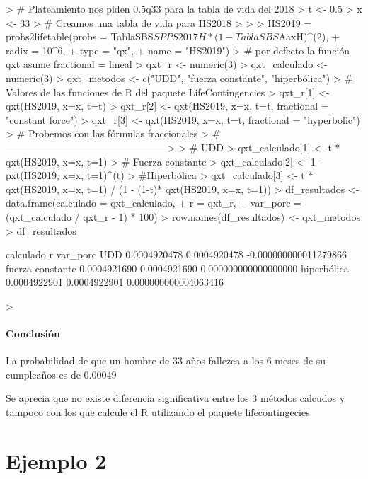 \documentclass[12pt]{report}
\begin{document}
\begin{Schunk}
\begin{Sinput}
> # Plateamiento nos piden 0.5q33 para la tabla de vida del 2018
> t <- 0.5
> x <- 33
> # Creamos una tabla de vida para HS2018
> 
> 
> HS2019  = probs2lifetable(probs = TablaSBS$SPPS2017H * (1 - TablaSBS$AaxH)^(2), 
+                           radix = 10^6,   
+                           type = "qx",  
+                           name = "HS2019")
> # por defecto la función qxt asume fractional = lineal
> qxt_r <- numeric(3)
> qxt_calculado <- numeric(3)
> qxt_metodos <- c("UDD", "fuerza constante", "hiperbólica")
> # Valores de las funciones de R del paquete LifeContingencies
> qxt_r[1] <- qxt(HS2019, x=x, t=t)
> qxt_r[2] <- qxt(HS2019, x=x, t=t, fractional = "constant force")
> qxt_r[3] <- qxt(HS2019, x=x, t=t, fractional = "hyperbolic")
> # Probemos con las fórmulas fraccionales
> #------------------------------------------------
> 
> # UDD
> qxt_calculado[1] <- t * qxt(HS2019, x=x, t=1) 
> # Fuerza constante
> qxt_calculado[2] <- 1 - pxt(HS2019, x=x, t=1)^(t) 
> #Hiperbólica
> qxt_calculado[3] <- t * qxt(HS2019, x=x, t=1) / (1 - (1-t)* qxt(HS2019, x=x, t=1)) 
> df_resultados <- data.frame(calculado = qxt_calculado,
+                             r = qxt_r,
+                             var_porc = (qxt_calculado / qxt_r - 1) * 100)
> row.names(df_resultados) <- qxt_metodos
> df_resultados
\end{Sinput}
\begin{Soutput}
                    calculado            r              var_porc
UDD              0.0004920478 0.0004920478 -0.000000000011279866
fuerza constante 0.0004921690 0.0004921690  0.000000000000000000
hiperbólica      0.0004922901 0.0004922901  0.000000000004063416
\end{Soutput}
\begin{Sinput}
> 
\end{Sinput}
\end{Schunk}

\paragraph{Conclusi\'on}
La probabilidad de que un hombre de 33 años fallezca a los 6 meses de su cumpleaños es de 0.00049

Se aprecia que no existe diferencia significativa entre los 3 métodos calcudos y tampoco con los que calcule el R utilizando el paquete lifecontingecies

\section{Ejemplo 2}
\end{document}
